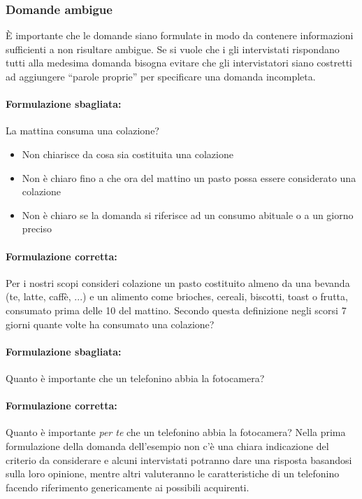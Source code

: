 \subsubsection{Domande ambigue}
È importante che le domande siano formulate in modo da contenere informazioni sufficienti a non risultare ambigue. Se si vuole che i gli intervistati rispondano tutti alla medesima domanda bisogna evitare che gli intervistatori siano costretti ad aggiungere “parole proprie” per specificare una domanda incompleta.
\paragraph{Formulazione sbagliata:} La mattina consuma una colazione? \newline
\begin{itemize}
	\item Non chiarisce da cosa sia costituita una colazione
	\item Non è chiaro fino a che ora del mattino un pasto possa essere considerato una colazione
	\item Non è chiaro se la domanda si riferisce ad un consumo abituale o a un giorno preciso
\end{itemize}

\paragraph{Formulazione corretta:} Per i nostri scopi consideri colazione un pasto costituito almeno da una bevanda (te, latte, caffè, ...) e un alimento come brioches, cereali, biscotti, toast o frutta, consumato prima delle 10 del mattino. Secondo questa definizione negli scorsi 7 giorni quante volte ha consumato una colazione?

\paragraph{Formulazione sbagliata:} Quanto è importante che un telefonino abbia la fotocamera?

\paragraph{Formulazione corretta:} Quanto è importante \textit{per te} che un telefonino abbia la fotocamera?
Nella prima formulazione della domanda dell'esempio non c'è una chiara indicazione del criterio da considerare e alcuni intervistati potranno dare una risposta basandosi sulla loro opinione, mentre altri valuteranno le caratteristiche di un telefonino facendo riferimento genericamente ai possibili acquirenti.

